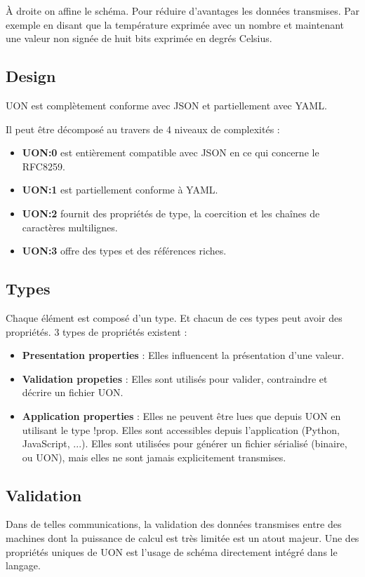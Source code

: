 \documentclass[
    iict, %
    il, %
]{heig-tb}
\begin{document}
À droite on affine le schéma. Pour réduire d'avantages les données transmises.
Par exemple en disant que la température exprimée avec un nombre et maintenant une valeur non signée de huit bits exprimée en degrés Celsius.

\subsection{Design}
UON est complètement conforme avec JSON et partiellement avec YAML.

Il peut être décomposé au travers de 4 niveaux de complexités :
\begin{itemize}
    \item \textbf{UON:0} est entièrement compatible avec JSON en ce qui concerne le RFC8259.
    \item \textbf{UON:1} est partiellement conforme à YAML.
    \item \textbf{UON:2} fournit des propriétés de type, la coercition et les chaînes de caractères multilignes.
    \item \textbf{UON:3} offre des types et des références riches.
\end{itemize}

\subsection{Types}
Chaque élément est composé d'un type. Et chacun de ces types peut avoir des propriétés.
3 types de propriétés existent :
\begin{itemize}
    \item \textbf{Presentation properties} : Elles influencent la présentation d'une valeur.
    \item \textbf{Validation propeties} : Elles sont utilisés pour valider, contraindre et décrire un fichier UON.
    \item \textbf{Application properties} : Elles ne peuvent être lues que depuis UON en utilisant le type !prop. Elles sont accessibles depuis l'application (Python, JavaScript, ...). Elles sont utilisées pour générer un fichier sérialisé (binaire, ou UON), mais elles ne sont jamais explicitement transmises.
\end{itemize}

\subsection{Validation}
Dans de telles communications, la validation des données transmises entre des machines dont la puissance de calcul est très limitée est un atout majeur.
Une des propriétés uniques de UON est l'usage de schéma directement intégré dans le langage.
\end{document}

